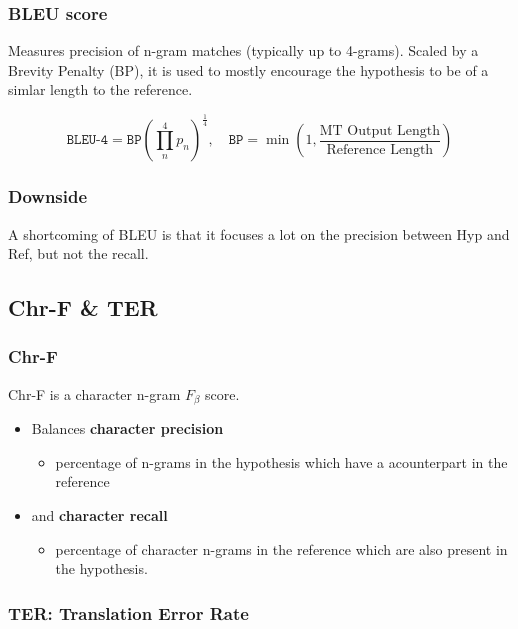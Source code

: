 \documentclass[11pt]{article}
\begin{document}
\subsubsection{BLEU score}

Measures precision of n-gram matches (typically up to 4-grams). Scaled by a Brevity Penalty (BP), it is used to mostly encourage the hypothesis to be of a simlar length to the reference.

\begin{equation}
    \texttt{BLEU-4} = \texttt{BP}(\prod^4_n p_n)^\frac{1}{4}, \quad \texttt{BP} = \min(1, \frac{\text{MT Output Length}}{\text{Reference Length}})
\end{equation}

\subsubsection{Downside}

A shortcoming of BLEU is that it focuses a lot on the precision between Hyp and Ref, but not the recall.

\subsection{Chr-F \& TER}

\subsubsection{Chr-F}

Chr-F is a character n-gram $F_\beta$ score. 

\begin{itemize}
    \item Balances \textbf{character precision} \begin{itemize}
        \item percentage of n-grams in the hypothesis which have a acounterpart in the reference
    \end{itemize}
    \item and \textbf{character recall} \begin{itemize}
        \item percentage of character n-grams in the reference which are also present in the hypothesis.
    \end{itemize}
\end{itemize}

\subsubsection{TER: Translation Error Rate}
\end{document}
